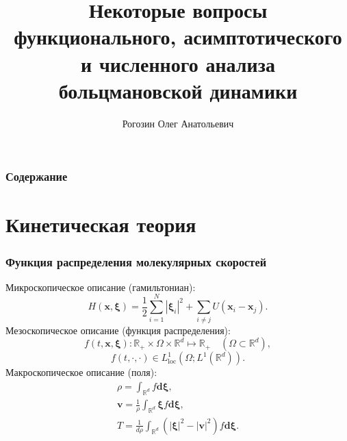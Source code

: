 \documentclass[mathserif]{beamer} %
\title{Некоторые вопросы функционального, асимптотического и численного анализа больцмановской динамики}
\author{Рогозин Олег Анатольевич}
\institute{
    Вычислительный центр ФИЦ ИУ РАН
}
\date{}
\newcommand{\loc}{\mathrm{loc}}
\newcommand{\dd}{d}%
\newcommand{\dxi}{\boldsymbol{\dd\xi}}
\newcommand{\bxi}{\boldsymbol{\xi}}
\newcommand{\bv}{\boldsymbol{v}}
\newcommand{\bx}{\boldsymbol{x}}
\begin{document}
\frame{\titlepage}

\begin{frame}
    \frametitle{Содержание}
    \linespread{0.8}
    \tableofcontents
\end{frame}

\section{Кинетическая теория}

\begin{frame}
    \frametitle{Функция распределения молекулярных скоростей}
    Микроскопическое описание (гамильтониан):
    \begin{equation*}
        H(\bx,\bxi) = \frac12 \sum_{i=1}^{N}|\bxi_i|^2 + \sum_{i\ne j} U(\bx_i - \bx_j).
    \end{equation*}
    Мезоскопическое описание (функция распределения): %
    \begin{equation*}
        f(t,\bx,\bxi): \mathbb{R}_+\times\Omega\times\mathbb{R}^d\mapsto\mathbb{R}_+
        \quad (\Omega\subset\mathbb{R}^d),
    \end{equation*}
    \begin{equation*}
        f(t,\cdot,\cdot) \in L^1_\loc(\Omega; L^1(\mathbb{R}^d)).
    \end{equation*}
    Макроскопическое описание (поля): %
    \begin{gather*}
        \rho = \int_{\mathbb{R}^d} f\dxi, \\
        \bv = \frac1\rho\int_{\mathbb{R}^d} \bxi f\dxi, \\
        T = \frac1{d\rho}\int_{\mathbb{R}^d} \left(|\bxi|^2 - |\bv|^2\right) f\dxi.
    \end{gather*}
\end{frame}
\end{document}
